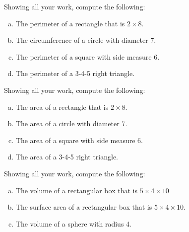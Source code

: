 \documentclass[11pt,letterpaper]{article}
\begin{document}

 Showing all your work, compute the following:
	\begin{enumerate}[(a)]
	\item The perimeter of a rectangle that is $2 \times 8$.
	\item The circumference of a circle with diameter 7.
	\item The perimeter of a square with side measure 6.
	\item The perimeter of a 3-4-5 right triangle. 
	\end{enumerate}



\newpage



 Showing all your work, compute the following:
	\begin{enumerate}[(a)]
	\item The area of a rectangle that is $2 \times 8$.
	\item The area of a circle with diameter 7.
	\item The area of a square with side measure 6.
	\item The area of a 3-4-5 right triangle. 
	\end{enumerate}



\newpage



 Showing all your work, compute the following:
	\begin{enumerate}[(a)]
	\item The volume of a rectangular box that is $5 \times 4 \times 10$
	\item The surface area of a rectangular box that is $5 \times 4 \times 10$.
	\item The volume of a sphere with radius 4.
	\end{enumerate}
\end{document}
